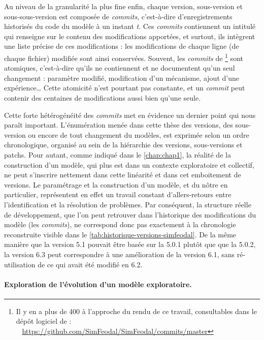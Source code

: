 Au niveau de la granularité la plus fine enfin, chaque version, sous-version et sous-sous-version est composée de \og \textit{commits}\fg{}, c'est-à-dire d'enregistrements historisés du code du modèle à un instant \textit{t}.
Ces \textit{commits} contiennent un intitulé qui renseigne sur le contenu des modifications apportées, et surtout, ils intègrent une liste précise de ces modifications : les modifications de chaque ligne (de chaque fichier) modifiée sont ainsi conservées.
Souvent, les \textit{commits} de \simfeodal{} \footnote{
	Il y en a plus de 400 à l'approche du rendu de ce travail, consultables dans le dépôt logiciel de \simfeodal{} :\\
	\faGithub~ \href{https://github.com/SimFeodal/SimFeodal/commits/master}{https://github.com/SimFeodal/SimFeodal/commits/master}
} sont \og atomiques\fg{}, c'est-à-dire qu'ils ne contiennent et ne documentent qu'un seul changement : paramètre modifié, modification d'un mécanisme, ajout d'une expérience\ldots
Cette atomicité n'est pourtant pas constante, et un \textit{commit} peut contenir des centaines de modifications aussi bien qu'une seule.

Cette forte hétérogénéité des \textit{commits} met en évidence un dernier point qui nous paraît important.
L'énumération menée dans cette thèse des versions, des sous-version ou encore de tout changement du modèles, est exprimée selon un ordre chronologique, organisé au sein de la hiérarchie des versions, sous-versions et patchs.
Pour autant, comme indiqué dans le \cref{chap:chap1}, la réalité de la construction d'un modèle, qui plus est dans un contexte exploratoire et collectif, ne peut s'inscrire nettement dans cette linéarité et dans cet emboitement de versions.
Le paramétrage et la construction d'un modèle, et du nôtre en particulier, représentent en effet un travail constant d'allers-retours entre l'identification et la résolution de problèmes.
Par conséquent, la structure réelle de développement, que l'on peut retrouver dans l'historique des modifications du modèle (les \og \textit{commits}\fg{}), ne correspond donc pas exactement à la chronologie reconstruite visible dans le \cref{tab:historique-versions-simfeodal}.
De la même manière que la version 5.1 pouvait être basée sur la 5.0.1 plutôt que que la 5.0.2, la version 6.3 peut correspondre à une amélioration de la version 6.1, sans ré-utilisation de ce qui avait été modifié en 6.2.

\paragraph{Exploration de l'évolution d'un modèle exploratoire.}

